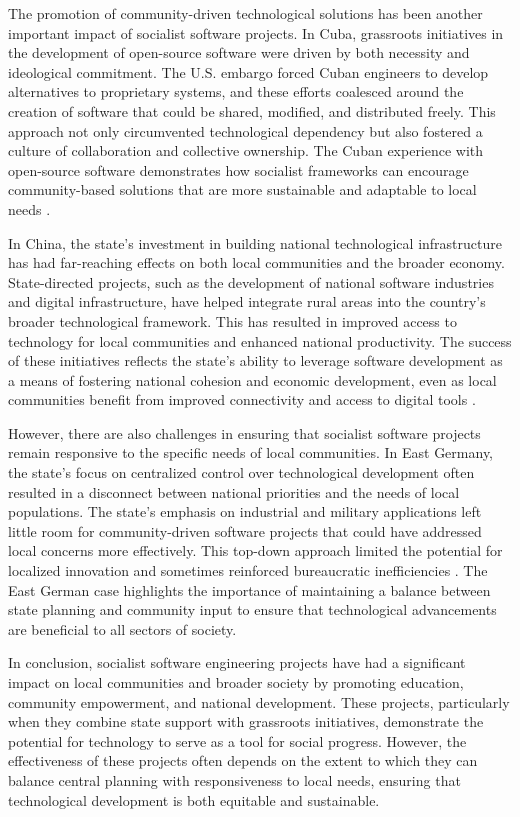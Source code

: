 \begin{refsection}
The promotion of community-driven technological solutions has been another important impact of socialist software projects. In Cuba, grassroots initiatives in the development of open-source software were driven by both necessity and ideological commitment. The U.S. embargo forced Cuban engineers to develop alternatives to proprietary systems, and these efforts coalesced around the creation of software that could be shared, modified, and distributed freely. This approach not only circumvented technological dependency but also fostered a culture of collaboration and collective ownership. The Cuban experience with open-source software demonstrates how socialist frameworks can encourage community-based solutions that are more sustainable and adaptable to local needs \cite[pp.~85-89]{feinberg2016}.

In China, the state's investment in building national technological infrastructure has had far-reaching effects on both local communities and the broader economy. State-directed projects, such as the development of national software industries and digital infrastructure, have helped integrate rural areas into the country's broader technological framework. This has resulted in improved access to technology for local communities and enhanced national productivity. The success of these initiatives reflects the state's ability to leverage software development as a means of fostering national cohesion and economic development, even as local communities benefit from improved connectivity and access to digital tools \cite[pp.~121-125]{huang2010}.

However, there are also challenges in ensuring that socialist software projects remain responsive to the specific needs of local communities. In East Germany, the state's focus on centralized control over technological development often resulted in a disconnect between national priorities and the needs of local populations. The state’s emphasis on industrial and military applications left little room for community-driven software projects that could have addressed local concerns more effectively. This top-down approach limited the potential for localized innovation and sometimes reinforced bureaucratic inefficiencies \cite[pp.~64-67]{berghoff2013}. The East German case highlights the importance of maintaining a balance between state planning and community input to ensure that technological advancements are beneficial to all sectors of society.

In conclusion, socialist software engineering projects have had a significant impact on local communities and broader society by promoting education, community empowerment, and national development. These projects, particularly when they combine state support with grassroots initiatives, demonstrate the potential for technology to serve as a tool for social progress. However, the effectiveness of these projects often depends on the extent to which they can balance central planning with responsiveness to local needs, ensuring that technological development is both equitable and sustainable.


\end{refsection}
